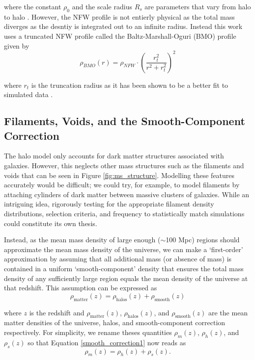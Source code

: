 \documentclass[%
 reprint,
 amsmath,amssymb,
 aps,nofootinbib
]{revtex4-1}
\begin{document}
\noindent where the constant $\rho_0$ and the scale radius $R_s$ are parameters that vary from halo to halo \cite{nfw}. However, the NFW profile is not entierly physical as the total mass diverges as the desntiy is integrated out to an infinite radius. Instead this work uses a truncated NFW profile called the Baltz-Marshall-Oguri (BMO) profile given by
\begin{equation}\label{bmo_profile}
\rho_{BMO}(r)=\rho_{NFW}\cdot\left(\frac{r_t^2}{r^2+r_t^2}\right)^2
\end{equation}

\noindent where $r_t$ is the truncation radius as it has been shown to be a better fit to simulated data \cite{nfw_bmo}.


\subsection{Filaments, Voids, and the Smooth-Component Correction}\label{scc}

The halo model only accounts for dark matter structures associated with galaxies. However, this neglects other mass structures such as the filaments and voids that can be seen in Figure \ref{fig:ms_structure}. Modelling these features accurately would be difficult; we could try, for example, to model filaments by attaching cylinders of dark matter between massive clusters of galaxies. While an intriguing idea, rigorously testing for the appropriate filament density distributions, selection criteria, and frequency to statistically match simulations could constitute its own thesis.

Instead, as the mean mass density of large enough ($\sim$100 Mpc) regions should approximate the mean mass density of the universe, we can make a `first-order' approximation by assuming that all additional mass (or absence of mass) is contained in a uniform `smooth-component' density that ensures the total mass density of any sufficiently large region equals the mean density of the universe at that redshift. This assumption can be expressed as
\begin{equation}\label{smooth_correction1}
\rho_{\text{matter}}(z)=\rho_{\text{halos}}(z)+\rho_{\text{smooth}}(z)
\end{equation}

\noindent where $z$ is the redshift and $\rho_{\text{matter}}(z)$, $\rho_{\text{halos}}(z)$, and $\rho_{\text{smooth}}(z)$ are the mean matter densities of the universe, halos, and smooth-component correction respectively. For simplicity, we rename theses quantities ${\rho_m(z)}$, ${\rho_h(z)}$, and ${\rho_s(z)}$ so that Equation \eqref{smooth_correction1} now reads as
\begin{equation}\label{smooth_correction2}
\rho_m(z)=\rho_h(z)+\rho_s(z).
\end{equation}
\end{document}

